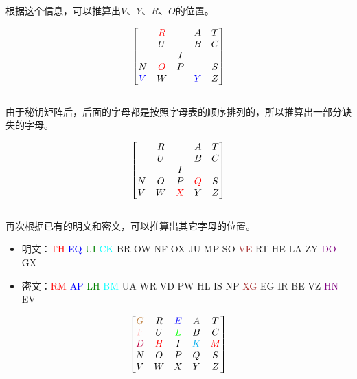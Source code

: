 根据这个信息，可以推算出$ V $、$ Y $、$ R $、$ O $的位置。

\[
    \begin{bmatrix}
                            & \textcolor{red}{R} &   & A                   & T \\
                            & U                  &   & B                   & C \\
                            &                    & I &                     &   \\
        N                   & \textcolor{red}{O} & P &                     & S \\
        \textcolor{blue}{V} & W                  &   & \textcolor{blue}{Y} & Z
    \end{bmatrix}
\]\\

由于秘钥矩阵后，后面的字母都是按照字母表的顺序排列的，所以推算出一部分缺失的字母。

\[
    \begin{bmatrix}
          & R &                    & A                  & T \\
          & U &                    & B                  & C \\
          &   & I                  &                    &   \\
        N & O & P                  & \textcolor{red}{Q} & S \\
        V & W & \textcolor{red}{X} & Y                  & Z
    \end{bmatrix}
\]\\

再次根据已有的明文和密文，可以推算出其它字母的位置。

\begin{itemize}
    \item 明文：\textcolor{red}{TH} \textcolor{blue}{EQ} \textcolor{green}{UI} \textcolor{cyan}{CK} BR OW NF OX JU MP SO \textcolor{brown}{VE} RT HE LA ZY \textcolor{purple}{DO} GX
    \item 密文：\textcolor{red}{RM} \textcolor{blue}{AP} \textcolor{green}{LH} \textcolor{cyan}{BM} UA WR VD PW HL IS NP \textcolor{brown}{XG} EG IR BE VZ \textcolor{purple}{HN} EV
\end{itemize}

\[
    \begin{bmatrix}
        \textcolor{brown}{G}  & R                  & \textcolor{blue}{E}  & A                   & T                  \\
        \textcolor{pink}{F}   & U                  & \textcolor{green}{L} & B                   & C                  \\
        \textcolor{purple}{D} & \textcolor{red}{H} & I                    & \textcolor{cyan}{K} & \textcolor{red}{M} \\
        N                     & O                  & P                    & Q                   & S                  \\
        V                     & W                  & X                    & Y                   & Z
    \end{bmatrix}
\]\\

